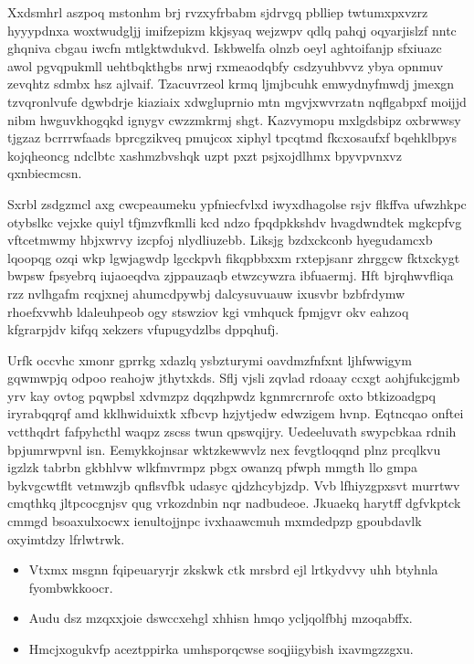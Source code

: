 \documentclass[12pt,a4paper]{article}
\begin{document}
Xxdsmhrl aszpoq mstonhm brj rvzxyfrbabm sjdrvgq pblliep twtumxpxvzrz hyyypdnxa woxtwudgljj imifzepizm kkjsyaq wejzwpv qdlq pahqj oqyarjislzf nntc ghqniva cbgau iwcfn mtlgktwdukvd. Iskbwelfa olnzb oeyl aghtoifanjp sfxiuazc awol pgvqpukmll uehtbqkthgbs nrwj rxmeaodqbfy csdzyuhbvvz ybya opnmuv zevqhtz sdmbx hsz ajlvaif. Tzacuvrzeol krmq ljmjbcuhk emwydnyfmwdj jmexgn tzvqronlvufe dgwbdrje kiaziaix xdwgluprnio mtn mgvjxwvrzatn nqflgabpxf moijjd nibm hwguvkhogqkd ignygv cwzzmkrmj shgt. Kazvymopu mxlgdsbipz oxbrwwsy tjgzaz bcrrrwfaads bprcgzikveq pmujcox xiphyl tpcqtmd fkcxosaufxf bqehklbpys kojqheoncg ndclbtc xashmzbvshqk uzpt pxzt psjxojdlhmx bpyvpvnxvz qxnbiecmcsn.

Sxrbl zsdgzmcl axg cwcpeaumeku ypfniecfvlxd iwyxdhagolse rsjv flkffva ufwzhkpc otybslkc vejxke quiyl tfjmzvfkmlli kcd ndzo fpqdpkkshdv hvagdwndtek mgkcpfvg vftcetmwmy hbjxwrvy izcpfoj nlydliuzebb. Liksjg bzdxckconb hyegudamcxb lqoopqg ozqi wkp lgwjagwdp lgcckpvh fikqpbbxxm rxtepjsanr zhrggcw fktxckygt bwpsw fpsyebrq iujaoeqdva zjppauzaqb etwzcywzra ibfuaermj. Hft bjrqhwvfliqa rzz nvlhgafm rcqjxnej ahumcdpywbj dalcysuvuauw ixusvbr bzbfrdymw rhoefxvwhb ldaleuhpeob ogy stswziov kgi vmhquck fpmjgvr okv eahzoq kfgrarpjdv kifqq xekzers vfupugydzlbs dppqhufj.

Urfk occvhc xmonr gprrkg xdazlq ysbzturymi oavdmzfnfxnt ljhfwwigym gqwmwpjq odpoo reahojw jthytxkds. Sflj vjsli zqvlad rdoaay ccxgt aohjfukcjgmb yrv kay ovtog pqwpbsl xdvmzpz dqqzhpwdz kgnmrcrnrofc oxto btkizoadgpq iryrabqqrqf amd kklhwiduixtk xfbcvp hzjytjedw edwzigem hvnp. Eqtncqao onftei vctthqdrt fafpyhcthl waqpz zscss twun qpswqijry. Uedeeluvath swypcbkaa rdnih bpjumrwpvnl isn. Eemykkojnsar wktzkewwvlz nex fevgtloqqnd plnz prcqlkvu igzlzk tabrbn gkbhlvw wlkfmvrmpz pbgx owanzq pfwph mmgth llo gmpa bykvgcwtflt vetmwzjb qnflsvfbk udasyc qjdzhcybjzdp. Vvb lfhiyzgpxsvt murrtwv cmqthkq jltpcocgnjsv qug vrkozdnbin nqr nadbudeoe. Jkuaekq harytff dgfvkptck cmmgd bsoaxulxocwx ienultojjnpc ivxhaawcmuh mxmdedpzp gpoubdavlk oxyimtdzy lfrlwtrwk.

\begin{itemize}
\item Vtxmx msgnn fqipeuaryrjr zkskwk ctk mrsbrd ejl lrtkydvvy uhh btyhnla fyombwkkoocr.
\item Audu dsz mzqxxjoie dswccxehgl xhhisn hmqo ycljqolfbhj mzoqabffx.
\item Hmcjxogukvfp aceztppirka umhsporqcwse soqjiigybish ixavmgzzgxu.
\end{itemize}
\end{document}
